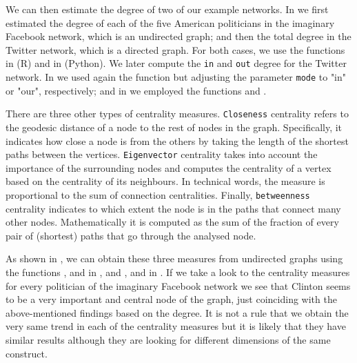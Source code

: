 We can then estimate the degree of two of our example networks. In  we first estimated the degree of each of the five American politicians in the imaginary Facebook network, which is an undirected graph; and then the total degree in the Twitter network, which is a directed graph. For both cases, we use the functions  in  (R) and  in  (Python). We later compute the \texttt{in} and \texttt{out} degree for the Twitter network. In  we used again the function  but adjusting the parameter \texttt{mode} to "in" or "our", respectively; and in  we employed the functions  and .


There are three other types of centrality measures. \texttt{Closeness} centrality refers to the geodesic distance of a node to the rest of nodes in the graph. Specifically, it indicates how close a node is from the others by taking the length of the shortest paths between the vertices. \texttt{Eigenvector} centrality takes into account the importance of the surrounding nodes and computes the centrality of a vertex based on the centrality of its neighbours. In technical words, the measure is proportional to the sum of connection centralities. Finally, \texttt{betweenness} centrality indicates to which extent the node is in the paths that connect many other nodes. Mathematically it is computed as the sum of the fraction of every pair of (shortest) paths that go through the analysed node. 

As shown in , we can obtain these three measures from undirected graphs using the functions ,  and  in , and ,  and  in . If we take a look to the centrality measures for every politician of the imaginary Facebook network we see that Clinton seems to be a very important and central node of the graph, just coinciding with the above-mentioned findings based on the degree. It is not a rule that we obtain the very same trend in each of the centrality measures but it is likely that they have similar results although they are looking for different dimensions of the same construct.



